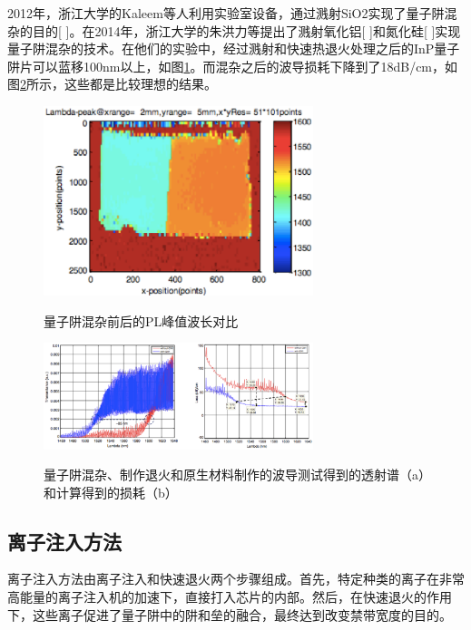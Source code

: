 \documentclass{ZJUthesis}
\begin{document}
2012年，浙江大学的Kaleem等人利用实验室设备，通过溅射SiO2实现了量子阱混杂的目的[ ]。在2014年，浙江大学的朱洪力等提出了溅射氧化铝[ ]和氮化硅[ ]实现量子阱混杂的技术。在他们的实验中，经过溅射和快速热退火处理之后的InP量子阱片可以蓝移100nm以上，如图\ref{fig_sputter}。而混杂之后的波导损耗下降到了18dB/cm，如图\ref{fig_sputter2}所示，这些都是比较理想的结果。

\begin{figure}[!ht]
  \centering
  \includegraphics[width=0.7\textwidth]{./Pictures/sputter.eps}\\
  \caption{量子阱混杂前后的PL峰值波长对比}
  \label{fig_sputter}
\end{figure}

\begin{figure}[!ht]
  \centering
  \includegraphics[width=0.7\textwidth]{./Pictures/sputter2.eps}\\
  \caption{量子阱混杂、制作退火和原生材料制作的波导测试得到的透射谱（a）和计算得到的损耗（b）}
  \label{fig_sputter2}
\end{figure}

\subsection{离子注入方法}

离子注入方法由离子注入和快速退火两个步骤组成。首先，特定种类的离子在非常高能量的离子注入机的加速下，直接打入芯片的内部。然后，在快速退火的作用下，这些离子促进了量子阱中的阱和垒的融合，最终达到改变禁带宽度的目的。
\end{document}
